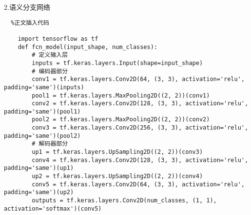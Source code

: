 2.语义分支网络
\begin{lstlisting}	%正文插入代码

    import tensorflow as tf
    def fcn_model(input_shape, num_classes):
        # 定义输入层
        inputs = tf.keras.layers.Input(shape=input_shape)
        # 编码器部分
        conv1 = tf.keras.layers.Conv2D(64, (3, 3), activation='relu', padding='same')(inputs)
        pool1 = tf.keras.layers.MaxPooling2D((2, 2))(conv1)
        conv2 = tf.keras.layers.Conv2D(128, (3, 3), activation='relu', padding='same')(pool1)
        pool2 = tf.keras.layers.MaxPooling2D((2, 2))(conv2)
        conv3 = tf.keras.layers.Conv2D(256, (3, 3), activation='relu', padding='same')(pool2)
        # 解码器部分
        up1 = tf.keras.layers.UpSampling2D((2, 2))(conv3)
        conv4 = tf.keras.layers.Conv2D(128, (3, 3), activation='relu', padding='same')(up1)
        up2 = tf.keras.layers.UpSampling2D((2, 2))(conv4)
        conv5 = tf.keras.layers.Conv2D(64, (3, 3), activation='relu', padding='same')(up2)
        outputs = tf.keras.layers.Conv2D(num_classes, (1, 1), activation='softmax')(conv5)
\end{lstlisting}


